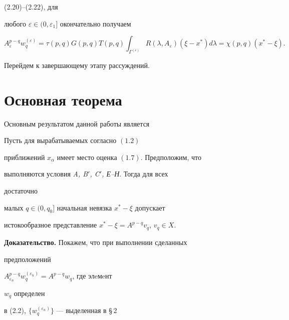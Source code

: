 (2.20)--(2.22), для 


любого $\varepsilon\in(0,\varepsilon_1]$ окончательно получаем


\begin{equation}


A^{p-q}_\varepsilon w^{(\varepsilon)}_q=\tau(p,q)G(p,q)


T(p,q)\int_{\Gamma^{(\varepsilon)}}R(\lambda,A_\varepsilon)


(\xi-x^*)d\lambda=\chi(p,q)(x^*-\xi).


\end{equation}





Перейдем к завершающему этапу рассуждений. 





\section{Основная теорема}





Основным результатом данной работы является





\begin{thmnonum}


Пусть для вырабатываемых согласно $(1.2)$


приближений $x_\alpha$ имеет место оценка $(1.7)$. Предположим, что 


выполняются условия {\em A, B$'$, C$'$, Е--Н}. Тогда для всех 


достаточно


малых $q\in(0,q_0]$ начальная невязка $x^*-\xi$ допускает


истокообразное представление $x^*-\xi=A^{p-q}v_q$, $v_q\in X$.


\end{thmnonum}





{\bf Доказательство.} Покажем, что при выполнении сделанных


предположений 


$A^{p-q}_{\varepsilon_n}w^{(\varepsilon_n)}_q=A^{p-q}w_q$, где элeмeнт 


$w_q$ определен


в (2.2), $\{w^{(\varepsilon_n)}_q\}$ --- выделенная в \S\,2 



